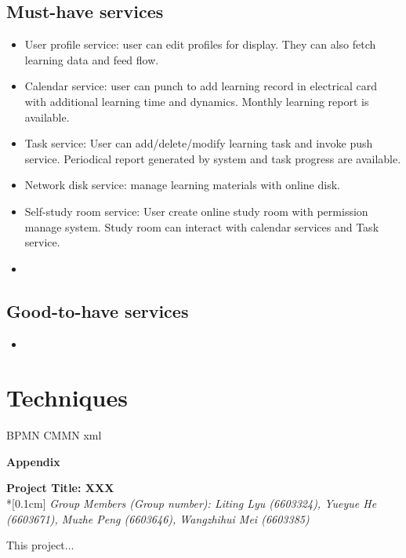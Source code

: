 \documentclass[runningheads]{llncs}
\begin{document}
\subsection*{Must-have services}
\begin{itemize}
    \item User profile service: user can edit profiles for display. They can also fetch learning data and feed flow.
    \item Calendar service: user can punch to add learning record in electrical card with additional learning time and dynamics. Monthly learning report is available.
    \item Task service: User can add/delete/modify learning task and invoke push service. Periodical report generated by system and task progress are available. 
    \item Network disk service: manage learning materials with online disk.
    \item Self-study room service: User create online study room with permission manage system. Study room can interact with calendar services and Task service.
    \item 
\end{itemize}
\subsection*{Good-to-have services}
\begin{itemize}
    \item 
\end{itemize}

\section*{Techniques}
BPMN CMMN xml 

\clearpage
\begin{flushleft}
    \huge{\textbf{Appendix}}
    \end{flushleft}
    \begin{center}
    \Large{\textbf{Project Title:  XXX }} \\*[0.1cm]%
    \large{\emph{Group Members (Group number): Liting Lyu (6603324), Yueyue  He (6603671), Muzhe Peng (6603646), Wangzhihui Mei (6603385)}} %
    \end{center}
    
    
    \noindent This project...
\end{document}
